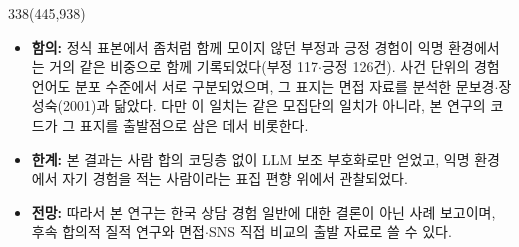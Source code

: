 \documentclass{article}
\newcommand{\bodyfs}{\fontsize{30}{40}\selectfont}
\begin{document}
\begin{textblock}{338}(445,938)
  \bodyfs\justifying
  \begin{itemize}
    \item \textbf{함의:} 정식 표본에서 좀처럼 함께 모이지 않던 부정과 긍정 경험이 익명 환경에서는 거의 같은 비중으로 함께 기록되었다(부정 117$\cdot$긍정 126건). 사건 단위의 경험 언어도 분포 수준에서 서로 구분되었으며, 그 표지는 면접 자료를 분석한 문보경$\cdot$장성숙(2001)과 닮았다. 다만 이 일치는 같은 모집단의 일치가 아니라, 본 연구의 코드가 그 표지를 출발점으로 삼은 데서 비롯한다.
    \item \textbf{한계:} 본 결과는 사람 합의 코딩층 없이 LLM 보조 부호화로만 얻었고, 익명 환경에서 자기 경험을 적는 사람이라는 표집 편향 위에서 관찰되었다.
    \item \textbf{전망:} 따라서 본 연구는 한국 상담 경험 일반에 대한 결론이 아닌 사례 보고이며, 후속 합의적 질적 연구와 면접$\cdot$SNS 직접 비교의 출발 자료로 쓸 수 있다.
  \end{itemize}
\end{textblock}
\end{document}
